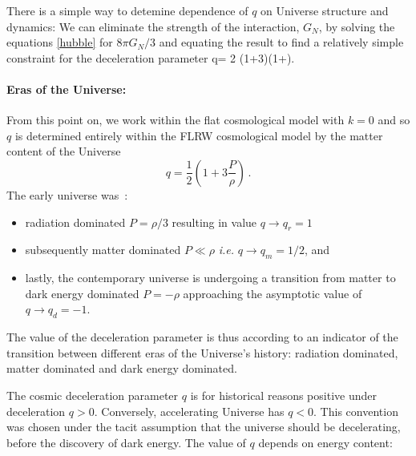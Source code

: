 There is a simple way to detemine  dependence of $q$ on Universe structure and dynamics: We can eliminate the strength of the interaction, $G_N$, by solving the equations \eqref{hubble} for ${8\pi G_N}/{3}$ and equating the result to find a relatively simple constraint for the deceleration parameter
\beqn\label{qparam}
q= 2 \left(1+3\right)\left(1+\right).
\eeqn
 

\paragraph{Eras of the Universe:}
From this point on, we work within the flat cosmological model with $k=0$ and so $q$ is determined entirely within the FLRW cosmological model by the matter content of the Universe
\begin{equation}\label{qparam}
\boxed{q=\frac 1 2 \left(1+3\frac{P}{\rho}\right)}\,.
\end{equation} 
The early universe was~\cite{Rafelski:2013yka}:
\begin{itemize}
\item radiation dominated $P=\rho/3$ resulting in value $q\to q_r = 1$
\item subsequently matter dominated $P\ll \rho$ {\it i.e.\/} $q \to q_m= 1/2 $, and 
\item lastly, the contemporary universe is undergoing a transition from matter to dark energy dominated $P=-\rho$ approaching the asymptotic value of $q\to q_d = -1$. 
\end{itemize} 
The value of the deceleration parameter is thus according to   an indicator of the transition between different eras of the Universe's history: radiation dominated, matter dominated and dark energy dominated. 

The cosmic deceleration  parameter $q$ is for historical reasons  positive under deceleration $q>0$. Conversely, accelerating Universe has $q<0$. This convention was chosen under the tacit assumption that the universe should be decelerating, before the discovery of dark energy. The value of $q$ depends on energy content: 

